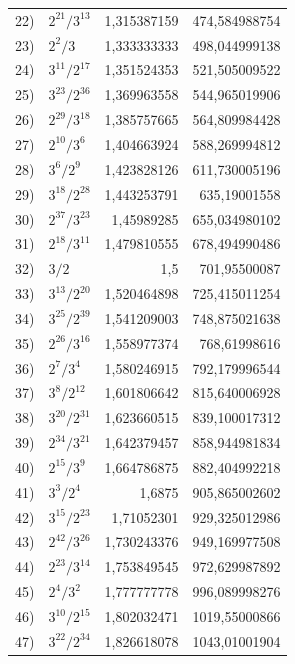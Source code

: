{\begin{longtable}{r @{\;} l r r}
    22) & $2^{21}/3^{13}$ & 1,315387159   & 474,584988754 \\
    23) & $2^{2}/3$       & 1,333333333   & 498,044999138 \\
    24) & $3^{11}/2^{17}$ & 1,351524353   & 521,505009522 \\
    25) & $3^{23}/2^{36}$ & 1,369963558   & 544,965019906 \\
    26) & $2^{29}/3^{18}$ & 1,385757665   & 564,809984428 \\
    27) & $2^{10}/3^{6}$  & 1,404663924   & 588,269994812 \\
    28) & $3^{6}/2^{9}$   & 1,423828126   & 611,730005196 \\
    29) & $3^{18}/2^{28}$ & 1,443253791   & 635,19001558 \\
    30) & $2^{37}/3^{23}$ & 1,45989285    & 655,034980102 \\
    31) & $2^{18}/3^{11}$ & 1,479810555   & 678,494990486 \\
    32) & $3/2$           & 1,5           & 701,95500087 \\
    33) & $3^{13}/2^{20}$ & 1,520464898   & 725,415011254 \\
    34) & $3^{25}/2^{39}$ & 1,541209003   & 748,875021638 \\
    35) & $2^{26}/3^{16}$ & 1,558977374   & 768,61998616 \\
    36) & $2^{7}/3^{4}$   & 1,580246915   & 792,179996544 \\
    37) & $3^{8}/2^{12}$  & 1,601806642   & 815,640006928 \\
    38) & $3^{20}/2^{31}$ & 1,623660515   & 839,100017312 \\
    39) & $2^{34}/3^{21}$ & 1,642379457   & 858,944981834 \\
    40) & $2^{15}/3^{9}$  & 1,664786875   & 882,404992218 \\
    41) & $3^{3}/2^{4}$   & 1,6875        & 905,865002602 \\
    42) & $3^{15}/2^{23}$ & 1,71052301    & 929,325012986 \\
    43) & $2^{42}/3^{26}$ & 1,730243376   & 949,169977508 \\
    44) & $2^{23}/3^{14}$ & 1,753849545   & 972,629987892 \\
    45) & $2^{4}/3^{2}$   & 1,777777778   & 996,089998276 \\
    46) & $3^{10}/2^{15}$ & 1,802032471   & 1019,55000866 \\
    47) & $3^{22}/2^{34}$ & 1,826618078   & 1043,01001904 \\

\end{longtable}}
